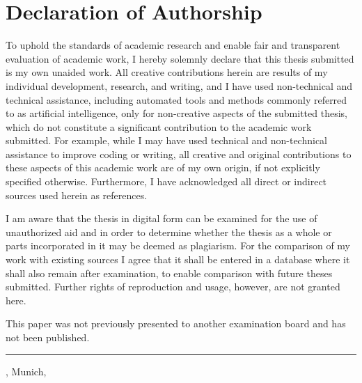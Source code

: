 \chapter*{Declaration of Authorship}

To uphold the standards of academic research and enable fair and transparent evaluation of academic work, I hereby solemnly declare that this thesis submitted is my own unaided work.
All creative contributions herein are results of my individual development, research, and writing, and I have used non-technical and technical assistance, including automated tools and methods commonly referred to as artificial intelligence, only for non-creative aspects of the submitted thesis, which do not constitute a significant contribution to the academic work submitted.
For example, while I may have used technical and non-technical assistance to improve coding or writing, all creative and original contributions to these aspects of this academic work are of my own origin, if not explicitly specified otherwise.
Furthermore, I have acknowledged all direct or indirect sources used herein as references.

I am aware that the thesis in digital form can be examined for the use of unauthorized aid and in order to determine whether the thesis as a whole or parts incorporated in it may be deemed as plagiarism. 
For the comparison of my work with existing sources I agree that it shall be entered in a database where it shall also remain after examination, to enable comparison with future theses submitted. 
Further rights of reproduction and usage, however, are not granted here.

This paper was not previously presented to another examination board and has not been published.


\vspace{2.5cm}
\noindent
\begin{minipage}{.6\textwidth}
\hrule
\vspace{3mm}
\Student, Munich, \SubmittedOn
\end{minipage}

